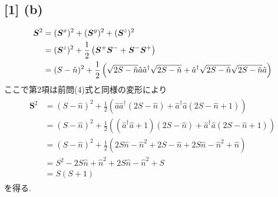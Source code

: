 \documentclass[uplatex,a4j,11pt,dvipdfmx]{jsarticle}
\begin{document}
\subsection*{[1] (b)}
\begin{align}
  \begin{split}
    {\bm S}^2&=({\bm S}^x)^2+({\bm S}^y)^2+({\bm S}^z)^2\\
    &=({\bm S}^z)^2+\frac{1}{2}\left({\bm S}^+{\bm S}^-+{\bm S}^-{\bm S}^+\right)\\
    &=(S-\hat{n})^2+\frac{1}{2}\left(\sqrt{2S-\Hat{n}}\hat{a}\hat{a}^\dagger\sqrt{2S-\hat{n}}+\hat{a}^\dagger\sqrt{2S-\hat{n}}\sqrt{2S-\Hat{n}}\hat{a}\right)
  \end{split}
\end{align}
ここで第2項は前問(4)式と同様の変形により
\begin{align}
  \begin{split}
    {\bm S}^2&=(S-\hat{n})^2+\frac{1}{2}\left(\hat{a}\hat{a}^\dagger(2S-\hat{n})+\hat{a}^\dagger\hat{a}(2S-\hat{n}+1)\right)\\
    &=(S-\hat{n})^2+\frac{1}{2}\left((\hat{a}^\dagger\hat{a}+1)(2S-\hat{n})+\hat{a}^\dagger\hat{a}(2S-\hat{n}+1)\right)\\
    &=(S-\hat{n})^2+\frac{1}{2}\left(2S\hat{n}-\hat{n}^2+2S-\hat{n}+2S\hat{n}-\hat{n}^2+\hat{n}\right)\\
    &=S^2-2S\hat{n}+\hat{n}^2+2S\hat{n}-\hat{n}^2+S\\
    &=S(S+1)
  \end{split}
\end{align}
を得る.
\end{document}
